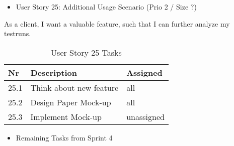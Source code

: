 \begin{itemize}
	\item User Story 25: Additional Usage Scenario (Prio 2 / Size ?)
	\end{itemize}
As a client, I want a valuable feature, such that I can further analyze my testruns.
\begin{table}[h]
  \caption{User Story 25 Tasks}
  \label{Story 23 Tasks}
  \centering
  \begin{tabular}{p{1cm}|p{5cm}|p{3cm}|}
  	Nr & Description & Assigned \\ 
  	\hline
  	25.1 & Think about new feature & all \\ 
  	\hline
  	25.2 & Design Paper Mock-up & all \\ 
  	\hline
  	25.3 & Implement Mock-up & unassigned \\ 
  	\hline
  \end{tabular}
\end{table}

\newpage
\begin{itemize}
	\item Remaining Tasks from Sprint 4
	\end{itemize}

